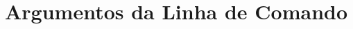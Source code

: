 \documentclass[xcolor={dvipsnames,table},aspectratio=169]{beamer}
\begin{document}

\section{Argumentos da Linha de Comando}
\end{document}
